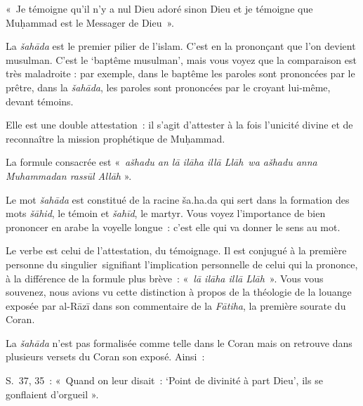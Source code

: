«~Je témoigne qu'il n'y a nul Dieu adoré sinon Dieu et je témoigne que
Muḥammad est le Messager de Dieu~».





La \emph{šahāda} est le premier pilier de l'islam. C'est en la
prononçant que l'on devient musulman. C'est le `baptême musulman', mais
vous voyez que la comparaison est très maladroite : par exemple, dans le
baptême les paroles sont prononcées par le prêtre, dans la
\emph{šahāda}, les paroles sont prononcées par le croyant lui-même,
devant témoins.

Elle est une double attestation~: il s'agit d'attester à la fois
l'unicité divine et de reconnaître la mission prophétique de Muḥammad.

La formule consacrée est «~\emph{ašhadu an lā ilāha illā Llāh}~\emph{wa
ašhadu anna Muhammadan rassūl Allāh} ».

Le mot \emph{šahāda} est constitué de la racine ša.ha.da qui sert dans
la formation des mots \emph{šāhid}, le témoin et \emph{šahīd}, le
martyr. Vous voyez l'importance de bien prononcer en arabe la voyelle
longue~: c'est elle qui va donner le sens au mot.

Le verbe est celui de l'attestation, du témoignage. Il est conjugué à la
première personne du singulier~signifiant l'implication personnelle de
celui qui la prononce, à la différence de la formule plus brève~:
«~\emph{lā ilāha illā Llāh}~». Vous vous souvenez, nous avions vu cette
distinction à propos de la théologie de la louange exposée par al-Rāzī
dans son commentaire de la \emph{Fātiha}, la première sourate du Coran.


La \emph{šahāda} n'est pas formalisée comme telle dans le Coran mais on
retrouve dans plusieurs versets du Coran son exposé. Ainsi~:

S.~37, 35~: «~Quand on leur disait~: `Point de divinité à part Dieu',
ils se gonflaient d'orgueil ».

